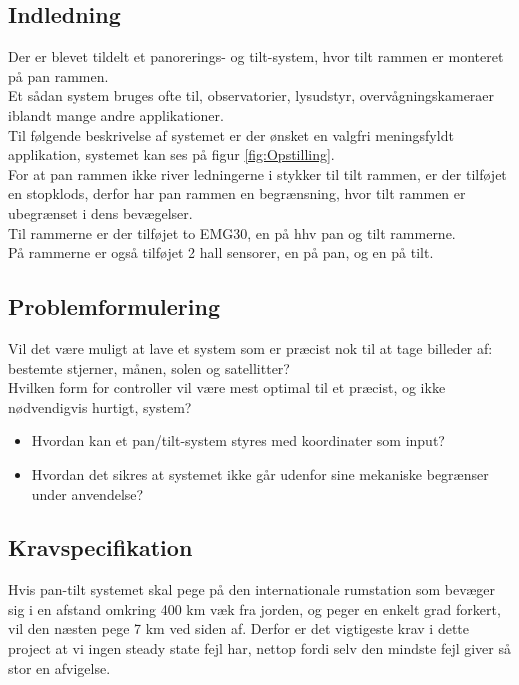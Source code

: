 \subsection{Indledning}
Der er blevet tildelt et panorerings- og tilt-system, hvor tilt rammen er monteret på pan rammen.\\
Et sådan system bruges ofte til, observatorier, lysudstyr, overvågningskameraer iblandt mange andre applikationer.\\
Til følgende beskrivelse af systemet er der ønsket en valgfri meningsfyldt applikation, systemet kan ses på figur \ref{fig:Opstilling}.\\
For at pan rammen ikke river ledningerne i stykker til tilt rammen, er der tilføjet en stopklods, derfor har pan rammen en begrænsning, hvor tilt rammen er ubegrænset i dens bevægelser.\\
Til rammerne er der tilføjet to EMG30\cite{emg30Data}, en på hhv pan og tilt rammerne.\\
På rammerne er også tilføjet 2 hall sensorer, en på pan, og en på tilt. 


\subsection{Problemformulering}

Vil det være muligt at lave et system som er præcist nok til at tage billeder af: bestemte stjerner, månen, solen og satellitter?\\
Hvilken form for controller vil være mest optimal til et præcist, og ikke nødvendigvis hurtigt, system?

\begin{itemize}
	\item Hvordan kan et pan/tilt-system styres med koordinater som input?
	\item Hvordan det sikres at systemet ikke går udenfor sine mekaniske begrænser under anvendelse?
\end{itemize}

\subsection{Kravspecifikation}

Hvis pan-tilt systemet skal pege på den internationale rumstation som bevæger sig i en afstand omkring 400 km væk fra jorden, og peger en enkelt grad forkert, vil den næsten pege 7 km ved siden af. Derfor er det vigtigeste krav i dette project at vi ingen steady state fejl har, nettop fordi selv den mindste fejl giver så stor en afvigelse.

